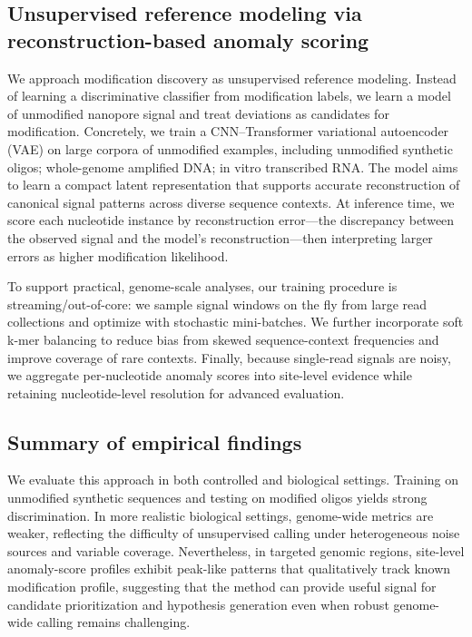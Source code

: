 \documentclass[sigconf, review]{acmart}
\begin{document}
\subsection{Unsupervised reference modeling via reconstruction-based anomaly scoring}
We approach modification discovery as unsupervised reference modeling. Instead of learning a discriminative classifier from modification labels, we learn a model of unmodified nanopore signal and treat deviations as candidates for modification. Concretely, we train a CNN--Transformer variational autoencoder (VAE) on large corpora of unmodified examples, including unmodified synthetic oligos; whole-genome amplified DNA; in vitro transcribed RNA. The model aims to learn a compact latent representation that supports accurate reconstruction of canonical signal patterns across diverse sequence contexts. At inference time, we score each nucleotide instance by reconstruction error---the discrepancy between the observed signal and the model’s reconstruction---then interpreting larger errors as higher modification likelihood.

To support practical, genome-scale analyses, our training procedure is streaming/out-of-core: we sample signal windows on the fly from large read collections and optimize with stochastic mini-batches. We further incorporate soft k-mer balancing to reduce bias from skewed sequence-context frequencies and improve coverage of rare contexts. Finally, because single-read signals are noisy, we aggregate per-nucleotide anomaly scores into site-level evidence while retaining nucleotide-level resolution for advanced evaluation.

\subsection{Summary of empirical findings}
We evaluate this approach in both controlled and biological settings. Training on unmodified synthetic sequences and testing on modified oligos yields strong discrimination. In more realistic biological settings, genome-wide metrics are weaker, reflecting the difficulty of unsupervised calling under heterogeneous noise sources and variable coverage. Nevertheless, in targeted genomic regions, site-level anomaly-score profiles exhibit peak-like patterns that qualitatively track known modification profile, suggesting that the method can provide useful signal for candidate prioritization and hypothesis generation even when robust genome-wide calling remains challenging.
\end{document}
